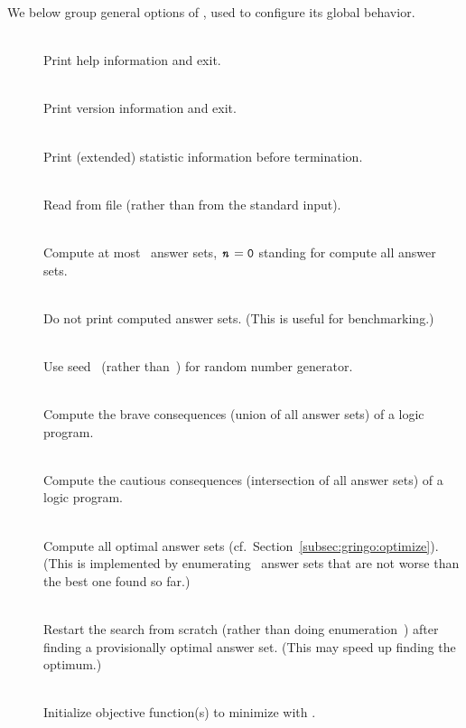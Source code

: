 We below group general options of \clasp,
used to configure its global behavior.
%
\begin{description}
\item[]~\\
Print help information and exit.
\item[]~\\
Print version information and exit.
\item[]~\\
Print (extended) statistic information before termination.
\item[]~\\
Read from file  (rather than from the standard input).
\item[]~\\
Compute at most~ answer sets,
$\texttt{\textit{n}}=\texttt{0}$ standing for compute all answer sets.
\item[]~\\
Do not print computed answer sets.
(This is useful for benchmarking.)
\item[]~\\
Use seed~ (rather than~) for random number generator.
\item[]~\\
Compute the brave consequences (union of all answer sets) of a logic program.
\item[]~\\
Compute the cautious consequences (intersection of all answer sets) of a logic program.
\item[]~\\
Compute all optimal answer sets (cf.\ Section~\ref{subsec:gringo:optimize}).
(This is implemented by enumerating~\cite{gekanesc07c} answer sets that are not worse
 than the best one found so far.)
\item[]~\\
Restart the search from scratch (rather than doing enumeration~\cite{gekanesc07c})
after finding a provisionally optimal answer set.
(This may speed up finding the optimum.)
\item[]~\\
Initialize objective function(s) to minimize with .

\end{description}
